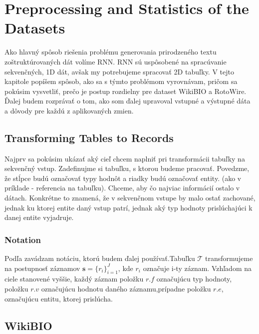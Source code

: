 \chapter{Preprocessing and Statistics of the Datasets}

Ako hlavný spôsob riešenia problému generovania prirodzeného textu zo\linebreak[4]štruktúrovaných dát volíme RNN. RNN sú uspôsobené na spracúvanie \linebreak[4]sekvenčných, 1D dát, avšak my potrebujeme spracovať 2D tabuľky. V tejto kapitole popíšem spôsob, ako sa s týmto problémom vyrovnávam, pričom sa pokúsim vysvetliť, prečo je postup rozdielny pre dataset WikiBIO a RotoWire. Ďalej budem rozprávať o tom, ako som ďalej upravoval vstupné a výstupné dáta a dôvody pre každú z aplikovaných zmien.

\section{Transforming Tables to Records}

Najprv sa pokúsim ukázať aký cieľ chcem naplniť pri transformácii tabuľky na sekvenčný vstup. Zadefinujme si tabuľku, s ktorou budeme pracovať. Povedzme, že stĺpce budú označovať typy hodnôt a riadky budú označovať entity. (ako v príklade - referencia na tabuľku). Chceme, aby čo najviac informácií ostalo v dátach. Konkrétne to znamená, že v sekvenčnom vstupe by malo ostať zachované, jednak ku ktorej entite daný vstup patrí, jednak aký typ hodnoty prislúchajúci k danej entite vyjadruje.

\subsection{Notation}

Podľa \citep{liang-etal-2009-learning} zavádzam notáciu, ktorú budem ďalej používať.\linebreak[4]Tabuľku $\mathcal{T}$ transformujeme na postupnosť záznamov $ \mathbf{s} = \{ r_i \}_{i=1}^{J} $, kde $r_i$ označuje i-ty záznam. Vzhľadom na ciele stanovené vyššie, každý záznam položku $r.f$ označujúcu typ hodnoty, položku $r.v$ označujúcu hodnotu daného záznamu,\linebreak[4]prípadne položku $r.e$, označujúcu entitu, ktorej prislúcha.

\section{WikiBIO}

